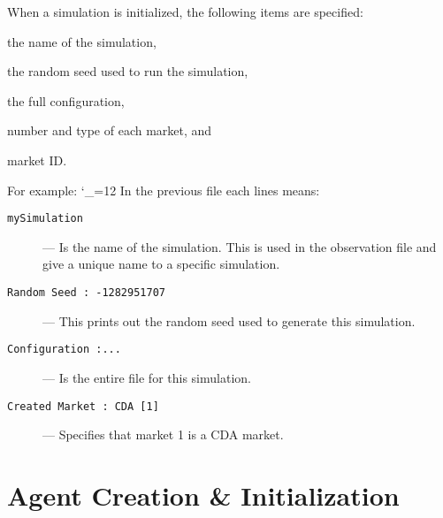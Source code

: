 \documentclass[11pt]{article}
\newcommand{\includefile}[2][]{\begingroup
  \catcode`_=12 \docode{#1}{#2}}
\newcommand{\docode}[2]{}
\begin{document}
When a simulation is initialized, the following items are
specified: \begin{inparaenum}[1)] \item the name of the simulation, \item the
  random seed used to run the simulation, \item the full configuration, \item number and type of each market,
  and \item market ID. \end{inparaenum} For example:
\includefile[lastline=5]{simulations_1_13-Oct-2013_16.35.17.txt}
In the previous file each lines means:
\begin{description}
\item[\texttt{mySimulation}] --- Is the name of the simulation. This is used in
  the observation file and give a unique name to a specific simulation.
\item[\texttt{Random Seed : -1282951707}] --- This prints out the random seed
  used to generate this simulation.
\item[\texttt{Configuration :...}] --- Is the entire 
  file for this simulation.
\item[\texttt{Created Market : CDA [1]}] --- Specifies that market 1 is a CDA
  market.
\end{description}

\section{Agent Creation \& Initialization}

\end{document}
